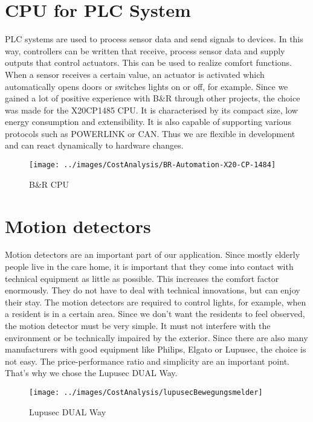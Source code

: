 \section{CPU for PLC System}
PLC systems are used to process sensor data and send signals to devices. In this way, controllers can be written that receive, process sensor data and supply outputs that control actuators. This can be used to realize comfort functions. When a sensor receives a certain value, an actuator is activated which automatically opens doors or switches lights on or off, for example. Since we gained a lot of positive experience with B\&R through other projects, the choice was made for the X20CP1485 CPU. It is characterised by its compact size, low energy consumption and extensibility. It is also capable of supporting various protocols such as POWERLINK or CAN. Thus we are flexible in development and can react dynamically to hardware changes.

\begin{figure}[h]
	\centering
	\texttt{[image: ../images/CostAnalysis/BR-Automation-X20-CP-1484]} 
	\caption{B\&R CPU}
	\label{fig:brCPU}
\end{figure}

\section{Motion detectors}
Motion detectors are an important part of our application. Since mostly elderly people live in the care home, it is important that they come into contact with technical equipment as little as possible. This increases the comfort factor enormously. They do not have to deal with technical innovations, but can enjoy their stay. The motion detectors are required to control lights, for example, when a resident is in a certain area. Since we don't want the residents to feel observed, the motion detector must be very simple. It must not interfere with the environment or be technically impaired by the exterior. Since there are also many manufacturers with good equipment like Philips, Elgato or Lupusec, the choice is not easy. The price-performance ratio and simplicity are an important point. That's why we chose the Lupusec DUAL Way.

\begin{figure}[h]
	\centering
	\texttt{[image: ../images/CostAnalysis/lupusecBewegungsmelder]} 
	\caption{Lupusec DUAL Way}
	\label{fig:lupusecDual}
\end{figure}


